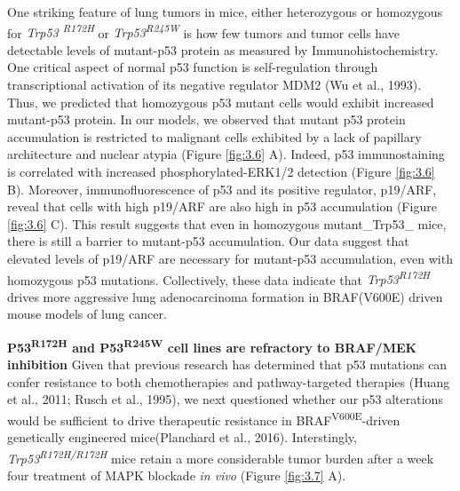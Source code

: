 One striking feature of lung tumors in mice, either heterozygous or homozygous for \emph{Trp53 \textsuperscript{R172H}} or \emph{Trp53\textsuperscript{R245W}} is how few tumors and tumor cells have detectable levels of mutant-p53 protein as measured by Immunohistochemistry. One critical aspect of normal p53 function is self-regulation through transcriptional activation of its negative regulator MDM2 (Wu et al., 1993). Thus, we predicted that homozygous p53 mutant cells would exhibit increased mutant-p53 protein. In our models, we observed that mutant p53 protein accumulation is restricted to malignant cells exhibited by a lack of papillary architecture and nuclear atypia (Figure \ref{fig:3.6} A). Indeed, p53 immunostaining is correlated with increased phosphorylated-ERK1/2 detection (Figure \ref{fig:3.6} B).
Moreover, immunofluorescence of p53 and its positive regulator, p19/ARF, reveal that cells with high p19/ARF are also high in p53 accumulation (Figure \ref{fig:3.6} C). This result suggests that even in homozygous mutant\_Trp53\_ mice, there is still a barrier to mutant-p53 accumulation. Our data suggest that elevated levels of p19/ARF are necessary for mutant-p53 accumulation, even with homozygous p53 mutations. Collectively, these data indicate that \emph{Trp53\textsuperscript{R172H}} drives more aggressive lung adenocarcinoma formation in BRAF(V600E) driven mouse models of lung cancer.

\textbf{P53\textsuperscript{R172H} and P53\textsuperscript{R245W} cell lines are refractory to BRAF/MEK inhibition}
Given that previous research has determined that p53 mutations can confer resistance to both chemotherapies and pathway-targeted therapies (Huang et al., 2011; Rusch et al., 1995), we next questioned whether our p53 alterations would be sufficient to drive therapeutic resistance in BRAF\textsuperscript{V600E}-driven genetically engineered mice(Planchard et al., 2016). Interstingly, \emph{Trp53\textsuperscript{R172H/R172H}} mice retain a more considerable tumor burden after a week four treatment of MAPK blockade \emph{in vivo} (Figure \ref{fig:3.7} A).

